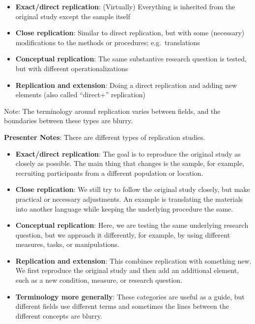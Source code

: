 \documentclass[
  english,
  letterpaper,
  DIV=11,
  numbers=noendperiod]{scrartcl}
\providecommand{\tightlist}{%
  \setlength{\itemsep}{0pt}\setlength{\parskip}{0pt}}
\begin{document}
\begin{itemize}
\tightlist
\item
  \textbf{Exact/direct replication}: (Virtually) Everything is inherited
  from the original study except the sample itself
\item
  \textbf{Close replication}: Similar to direct replication, but with
  some (necessary) modifications to the methods or procedures;
  e.g.~translations
\item
  \textbf{Conceptual replication}: The same substantive research
  question is tested, but with different operationalizations
\item
  \textbf{Replication and extension}: Doing a direct replication and
  adding new elements (also called ``direct+'' replication)
\end{itemize}

Note: The terminology around replication varies between fields, and the
boundaries between these types are blurry.

\textbf{Presenter Notes}: There are different types of replication
studies.

\begin{itemize}
\item
  \textbf{Exact/direct replication}: The goal is to reproduce the
  original study as closely as possible. The main thing that changes is
  the sample, for example, recruiting participants from a different
  population or location.
\item
  \textbf{Close replication}: We still try to follow the original study
  closely, but make practical or necessary adjustments. An example is
  translating the materials into another language while keeping the
  underlying procedure the same.
\item
  \textbf{Conceptual replication}: Here, we are testing the same
  underlying research question, but we approach it differently, for
  example, by using different measures, tasks, or manipulations.
\item
  \textbf{Replication and extension}: This combines replication with
  something new. We first reproduce the original study and then add an
  additional element, such as a new condition, measure, or research
  question.
\item
  \textbf{Terminology more generally}: These categories are useful as a
  guide, but different fields use different terms and sometimes the
  lines between the different concepts are blurry.
\end{itemize}
\end{document}
